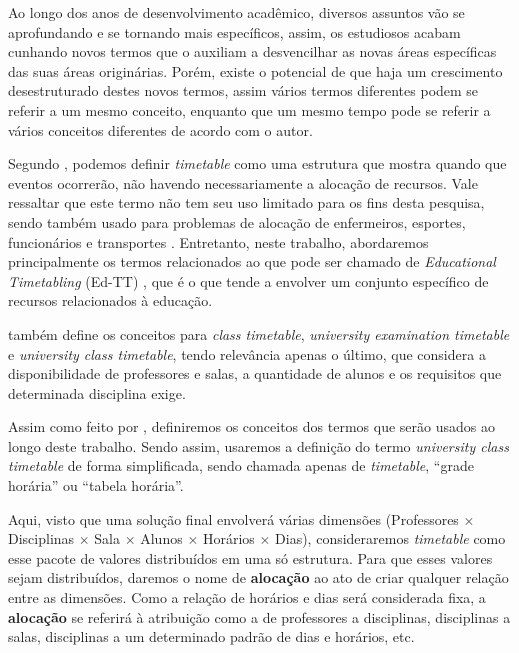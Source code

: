 Ao longo dos anos de desenvolvimento acadêmico, diversos assuntos vão se aprofundando e se tornando mais específicos, assim, os estudiosos acabam cunhando novos termos que o auxiliam a desvencilhar as novas áreas específicas das suas áreas originárias. Porém, existe o potencial de que haja um crescimento desestruturado destes novos termos, assim vários termos diferentes podem se referir a um mesmo conceito, enquanto que um mesmo tempo pode se referir a vários conceitos diferentes de acordo com o autor.

Segundo , podemos definir \textit{timetable} como uma estrutura que mostra quando que eventos ocorrerão, não havendo necessariamente a alocação de recursos. Vale ressaltar que este termo não tem seu uso limitado para os fins desta pesquisa, sendo também usado para problemas de alocação de enfermeiros, esportes, funcionários e transportes \cite{arratia-martinez_university_2021}. Entretanto, neste trabalho, abordaremos principalmente os termos relacionados ao que pode ser chamado de \textit{Educational Timetabling} (Ed-TT) \cite{Alencar2019}, que é o que tende a envolver um conjunto específico de recursos relacionados à educação.

 também define os conceitos para \textit{class timetable}, \textit{university examination timetable} e \textit{university class timetable}, tendo relevância apenas o último, que considera a disponibilidade de professores e salas, a quantidade de alunos e os requisitos que determinada disciplina exige.

Assim como feito por , definiremos os conceitos dos termos que serão usados ao longo deste trabalho. Sendo assim, usaremos a definição do termo \textit{university class timetable} de forma simplificada, sendo chamada apenas de \textit{timetable}, ``grade horária'' ou ``tabela horária''.


Aqui, visto que uma solução final envolverá várias dimensões (Professores $\times$ Disciplinas $\times$ Sala $\times$ Alunos $\times$ Horários $\times$ Dias), consideraremos \textit{timetable} como esse pacote de valores distribuídos em uma só estrutura. Para que esses valores sejam distribuídos, daremos o nome de \textbf{alocação} ao ato de criar qualquer relação entre as dimensões. Como a relação de horários e dias será considerada fixa, a \textbf{alocação} se referirá à atribuição como a de professores a disciplinas, disciplinas a salas, disciplinas a um determinado padrão de dias e horários, etc.

